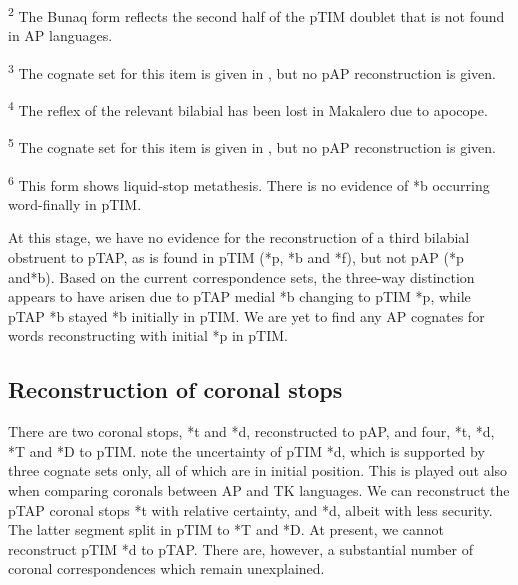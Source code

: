 \begin{table}
\textsuperscript{2} The Bunaq form reflects the second half of the pTIM doublet that is not found in AP languages.

\textsuperscript{3} The cognate set for this item is given in \citet{HoltonEtAl2012}, but no pAP reconstruction is given.

\textsuperscript{4} The reflex of the relevant bilabial has been lost in Makalero due to apocope.

\textsuperscript{5} The cognate set for this item is given in \citet{HoltonEtAl2012}, but no pAP reconstruction is given.

\textsuperscript{6} This form shows liquid-stop metathesis. There is no evidence of *b occurring word-finally in pTIM.
\end{table}



At this stage, we have no evidence for the reconstruction of a third bilabial obstruent to pTAP, as is found in pTIM (*p, *b and *f), but not pAP (*p and*b). Based on the current correspondence sets, the three-way distinction appears to have arisen due to pTAP medial *b changing to pTIM *p, while pTAP *b stayed *b initially in pTIM. We are yet to find any AP cognates for words reconstructing with initial *p in pTIM.

\subsection{Reconstruction of coronal stops}
There are two coronal stops, *t and *d, reconstructed to pAP, and four, *t, *d, *T and *D to pTIM. \citet{SchapperEtAl2012} note the uncertainty of pTIM *d, which is supported by three cognate sets only, all of which are in initial position. This is played out also when comparing coronals between AP and TK languages. We can reconstruct the pTAP coronal stops *t with relative certainty, and *d, albeit with less security. The latter segment split in pTIM to *T and *D. At present, we cannot reconstruct pTIM *d to pTAP. There are, however, a substantial number of coronal correspondences which remain unexplained. 

